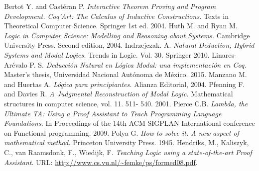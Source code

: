 \documentclass[a4paper,UKenglish]{lipics}
\begin{document}
\begin{thebibliography}{50}
 Bertot Y. and Castéran P. \textsl{Interactive Theorem Proving and Program Development. Coq'Art: The Calculus of Inductive Constructions.} Texts in Theoretical Computer Science. Springer 1st ed. 2004.
 Huth M. and Ryan M. \textsl{Logic in Computer Science: Modelling and Reasoning about Systems.} Cambridge University Press. Second edition, 2004. 
 Indrzejczak. A. \textsl{Natural Deduction, Hybrid Systems and Modal Logics.} Trends in Logic. Vol. 30. Springer 2010.
 Linares-Arévalo P. S. \textsl{Deducción Natural en Lógica Modal: una implementación en Coq.} Master's thesis, Universidad Nacional Autónoma de México. 2015. 
 Manzano M. and Huertas A. \textsl {Lógica para principiantes.} Alianza Editorial, 2004.
 Pfenning F. and Davies R. \textsl{A Judgmental Reconstruction of Modal Logic.} Mathematical structures in computer science, vol. 11. 511- 540. 2001. 
 Pierce C.B. \textsl{Lambda, the Ultimate TA: Using a Proof Assistant to Teach Programming Language Foundations.} In Proceedings  of the 14th ACM SIGPLAN International conference on Functional programming. 2009.
 Polya G. \textsl{How to solve it. A new aspect of mathematical method.} Princeton University Press. 1945. 
 Hendriks, M., Kaliszyk, C., van Raamsdonk, F., Wiedijk, F. \textsl{Teaching Logic using a state-of-the-art Proof Assistant}. 
URL: \url{http://www.cs.vu.nl/~femke/ps/formed08.pdf}.
\end{thebibliography}
\end{document}
